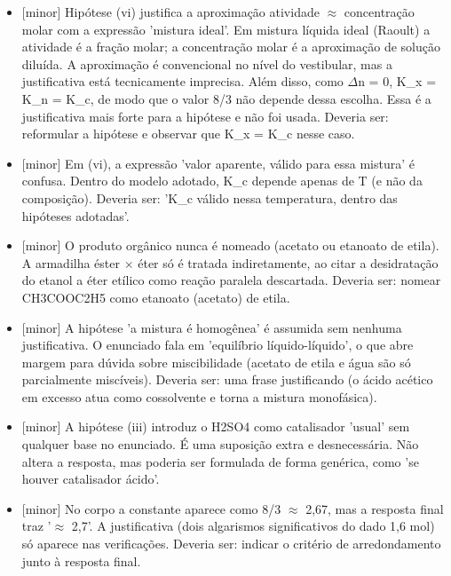 \documentclass{article}%
\begin{document}
\begin{itemize}%
\item%
{[}minor{]} Hipótese (vi) justifica a aproximação atividade $\approx$ concentração molar com a expressão 'mistura ideal'. Em mistura líquida ideal (Raoult) a atividade é a fração molar; a concentração molar é a aproximação de solução diluída. A aproximação é convencional no nível do vestibular, mas a justificativa está tecnicamente imprecisa. Além disso, como $\Delta$n = 0, K\_x = K\_n = K\_c, de modo que o valor 8/3 não depende dessa escolha. Essa é a justificativa mais forte para a hipótese e não foi usada. Deveria ser: reformular a hipótese e observar que K\_x = K\_c nesse caso.%
\item%
{[}minor{]} Em (vi), a expressão 'valor aparente, válido para essa mistura' é confusa. Dentro do modelo adotado, K\_c depende apenas de T (e não da composição). Deveria ser: 'K\_c válido nessa temperatura, dentro das hipóteses adotadas'.%
\item%
{[}minor{]} O produto orgânico nunca é nomeado (acetato ou etanoato de etila). A armadilha éster $\times$ éter só é tratada indiretamente, ao citar a desidratação do etanol a éter etílico como reação paralela descartada. Deveria ser: nomear CH3COOC2H5 como etanoato (acetato) de etila.%
\item%
{[}minor{]} A hipótese 'a mistura é homogênea' é assumida sem nenhuma justificativa. O enunciado fala em 'equilíbrio líquido{-}líquido', o que abre margem para dúvida sobre miscibilidade (acetato de etila e água são só parcialmente miscíveis). Deveria ser: uma frase justificando (o ácido acético em excesso atua como cossolvente e torna a mistura monofásica).%
\item%
{[}minor{]} A hipótese (iii) introduz o H2SO4 como catalisador 'usual' sem qualquer base no enunciado. É uma suposição extra e desnecessária. Não altera a resposta, mas poderia ser formulada de forma genérica, como 'se houver catalisador ácido'.%
\item%
{[}minor{]} No corpo a constante aparece como 8/3 $\approx$ 2,67, mas a resposta final traz '$\approx$ 2,7'. A justificativa (dois algarismos significativos do dado 1,6 mol) só aparece nas verificações. Deveria ser: indicar o critério de arredondamento junto à resposta final.%
\end{itemize}%
\end{document}
